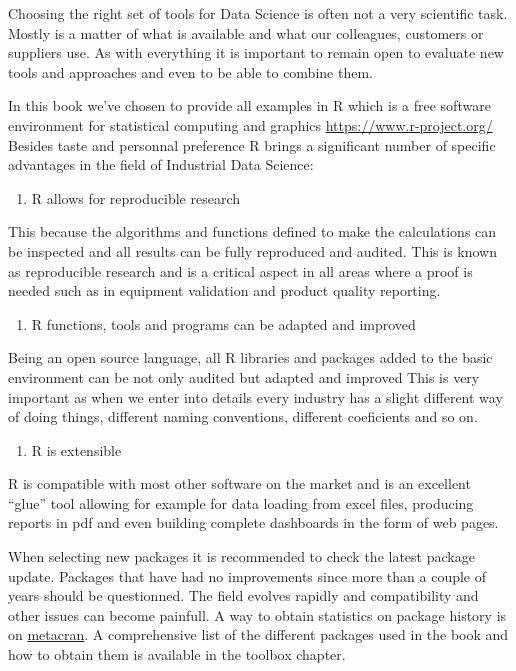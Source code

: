 \documentclass[
]{book}
\providecommand{\tightlist}{%
  \setlength{\itemsep}{0pt}\setlength{\parskip}{0pt}}
\begin{document}
Choosing the right set of tools for Data Science is often not a very scientific task. Mostly is a matter of what is available and what our colleagues, customers or suppliers use. As with everything it is important to remain open to evaluate new tools and approaches and even to be able to combine them.

In this book we've chosen to provide all examples in R which is a free software environment for statistical computing and graphics \url{https://www.r-project.org/}
Besides taste and personnal preference R brings a significant number of specific advantages in the field of Industrial Data Science:

\begin{enumerate}
\def\labelenumi{\arabic{enumi}.}
\tightlist
\item
  R allows for reproducible research
\end{enumerate}

This because the algorithms and functions defined to make the calculations can be inspected and all results can be fully reproduced and audited. This is known as reproducible research and is a critical aspect in all areas where a proof is needed such as in equipment validation and product quality reporting.

\begin{enumerate}
\def\labelenumi{\arabic{enumi}.}
\setcounter{enumi}{1}
\tightlist
\item
  R functions, tools and programs can be adapted and improved
\end{enumerate}

Being an open source language, all R libraries and packages added to the basic environment can be not only audited but adapted and improved This is very important as when we enter into details every industry has a slight different way of doing things, different naming conventions, different coeficients and so on.

\begin{enumerate}
\def\labelenumi{\arabic{enumi}.}
\setcounter{enumi}{2}
\tightlist
\item
  R is extensible
\end{enumerate}

R is compatible with most other software on the market and is an excellent ``glue'' tool allowing for example for data loading from excel files, producing reports in pdf and even building complete dashboards in the form of web pages.

When selecting new packages it is recommended to check the latest package update. Packages that have had no improvements since more than a couple of years should be questionned. The field evolves rapidly and compatibility and other issues can become painfull. A way to obtain statistics on package history is on \href{https://www.r-pkg.org/}{metacran}. A comprehensive list of the different packages used in the book and how to obtain them is available in the toolbox chapter.
\end{document}
